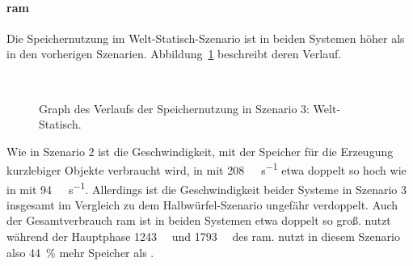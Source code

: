 \paragraph{\ac{ram}}
Die Speichernutzung im Welt-Statisch-Szenario ist in beiden Systemen höher als in den vorherigen Szenarien. Abbildung~\ref{fig:seed-0-static-mem} beschreibt deren Verlauf. 
\begin{figure}[!htbp]
	\\
	\caption{Graph des Verlaufs der Speichernutzung in Szenario 3: Welt-Statisch.}\label{fig:seed-0-static-mem}
\end{figure} 
Wie in Szenario 2 ist die Geschwindigkeit, mit der Speicher für die Erzeugung kurzlebiger Objekte verbraucht wird, in \sysB{} mit \SI{208}{\mega\byte\per\second} etwa doppelt so hoch wie in \sysA{} mit \SI{94}{\mega\byte\per\second}. Allerdings ist die Geschwindigkeit beider Systeme in Szenario 3 insgesamt im Vergleich zu dem Halbwürfel-Szenario ungefähr verdoppelt.
Auch der Gesamtverbrauch \ac{ram} ist in beiden Systemen etwa doppelt so groß. \sysA{} nutzt während der Hauptphase \SI{1243}{\mega\byte} und \sysB{} \SI{1793}{\mega\byte} des \ac{ram}. \sysB{} nutzt in diesem Szenario also \SI{44}{\percent} mehr Speicher als \sysA{}.   
